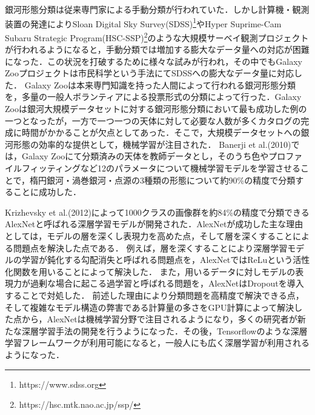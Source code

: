 \documentclass[a4j, 11pt]{jreport}
\begin{document}
銀河形態分類は従来専門家による手動分類が行われていた．しかし計算機・観測装置の発達によりSloan Digital Sky Survey(SDSS)\footnote{https://www.sdss.org}やHyper Suprime-Cam Subaru Strategic Program(HSC-SSP)\footnote{https://hsc.mtk.nao.ac.jp/ssp/}\cite{Tampo2020}のような大規模サーベイ観測プロジェクトが行われるようになると，手動分類では増加する膨大なデータ量への対応が困難になった．この状況を打破するために様々な試みが行われ，その中でもGalaxy Zooプロジェクト\cite{Lintott2008}は市民科学という手法にてSDSSへの膨大なデータ量に対応した．
Galaxy Zooは本来専門知識を持った人間によって行われる銀河形態分類を，多量の一般人ボランティアによる投票形式の分類によって行った．Galaxy Zooは銀河大規模データセットに対する銀河形態分類において最も成功した例の一つとなったが，一方で一つ一つの天体に対して必要な人数が多くカタログの完成に時間がかかることが欠点としてあった．そこで，大規模データセットへの銀河形態の効率的な提供として，機械学習が注目された．
Banerji et al.(2010)\cite{Banerji2010}では，Galaxy Zooにて分類済みの天体を教師データとし，そのうち色やプロファイルフィッティングなど12のパラメータについて機械学習モデルを学習させることで，楕円銀河・渦巻銀河・点源の3種類の形態について約90\%の精度で分類することに成功した．

Krizhevsky et al.(2012)\cite{Krizhevsky2012}によって1000クラスの画像群を約84\%の精度で分類できるAlexNetと呼ばれる深層学習モデルが開発された．AlexNetが成功した主な理由としては，モデルの層を深くし表現力を高めた点，そして層を深くすることによる問題点を解決した点である．
例えば，層を深くすることにより深層学習モデルの学習が鈍化する勾配消失と呼ばれる問題点を，AlexNetではReLu\cite{Glorot2011}という活性化関数を用いることによって解決した．
また，用いるデータに対しモデルの表現力が過剰な場合に起こる過学習と呼ばれる問題を，AlexNetはDropout\cite{Srivastava2014}を導入することで対処した．
前述した理由により分類問題を高精度で解決できる点，そして複雑なモデル構造の弊害である計算量の多さをGPU計算によって解決した点から，AlexNetは機械学習分野で注目されるようになり，多くの研究者が新たな深層学習手法の開発を行うようになった．その後，Tensorflow\cite{Abadi2016}のような深層学習フレームワークが利用可能になると，一般人にも広く深層学習が利用されるようになった．
\end{document}
